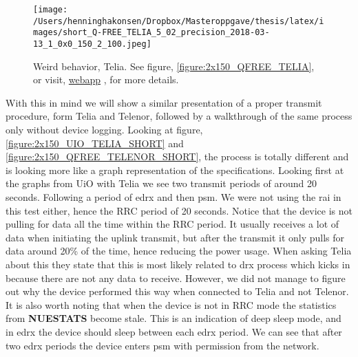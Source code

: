 \documentclass[USenglish]{ifimaster}  %
\begin{document}
\begin{figure}[H]
  \centering
  \texttt{[image: /Users/henninghakonsen/Dropbox/Masteroppgave/thesis/latex/images/short\_Q-FREE\_TELIA\_5\_02\_precision\_2018-03-13\_1\_0x0\_150\_2\_100.jpeg]}
  \caption{Weird behavior, Telia. See figure, \vref{figure:2x150_QFREE_TELIA}, or visit, \href{http://158.39.77.97:9000/\#/results/Q-FREE\_TELIA\_5.02\_precision\_2018-03-13\_1\_0x0\_150\_2\_100}{webapp} \cite{online:result0}, for more details.}
  \label{figure:2x150_QFREE_TELIA_SHORT}
\end{figure}

With this in mind we will show a similar presentation of a proper transmit procedure, form Telia and Telenor, followed by a walkthrough of the same process only without device logging. Looking at figure, \vref{figure:2x150_UIO_TELIA_SHORT} and \vref{figure:2x150_QFREE_TELENOR_SHORT}, the process is totally different and is looking more like a graph representation of the specifications. Looking first at the graphs from UiO with Telia we see two transmit periods of around 20 seconds. Following a period of \acrshort{edrx} and then \acrshort{psm}. We were not using the \acrshort{rai} in this test either, hence the RRC period of 20 seconds. Notice that the device is not pulling for data all the time within the RRC period. It usually receives a lot of data when initiating the uplink transmit, but after the transmit it only pulls for data around 20\% of the time, hence reducing the power usage. When asking Telia about this they state that this is most likely related to \acrshort{drx} process which kicks in because there are not any data to receive\cite{email:telia}. However, we did not manage to figure out why the device performed this way when connected to Telia and not Telenor.
It is also worth noting that when the device is not in RRC mode the statistics from \textbf{NUESTATS} become stale. This is an indication of deep sleep mode, and in \acrshort{edrx} the device should sleep between each \acrshort{edrx} period. We can see that after two \acrshort{edrx} periods the device enters \acrshort{psm} with permission from the network.
\end{document}
